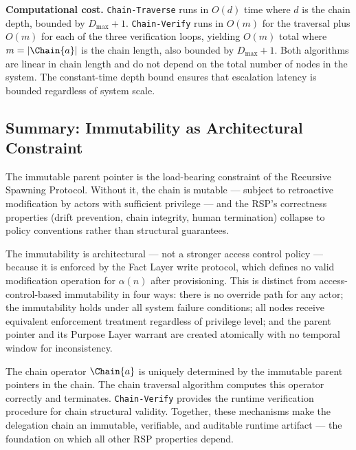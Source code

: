 \medskip
\noindent\textbf{Computational cost.} \texttt{Chain-Traverse} runs in $O(d)$ time where $d$ is the chain depth, bounded by $D_{\max} + 1$. \texttt{Chain-Verify} runs in $O(m)$ for the traversal plus $O(m)$ for each of the three verification loops, yielding $O(m)$ total where $m = |\Chain{a}|$ is the chain length, also bounded by $D_{\max} + 1$. Both algorithms are linear in chain length and do not depend on the total number of nodes in the system. The constant-time depth bound ensures that escalation latency is bounded regardless of system scale.

\subsection{Summary: Immutability as Architectural Constraint}
\label{sec:immutability-summary}

The immutable parent pointer is the load-bearing constraint of the Recursive Spawning Protocol. Without it, the chain is mutable — subject to retroactive modification by actors with sufficient privilege — and the RSP's correctness properties (drift prevention, chain integrity, human termination) collapse to policy conventions rather than structural guarantees.

The immutability is architectural — not a stronger access control policy — because it is enforced by the Fact Layer write protocol, which defines no valid modification operation for $\alpha(n)$ after provisioning. This is distinct from access-control-based immutability in four ways: there is no override path for any actor; the immutability holds under all system failure conditions; all nodes receive equivalent enforcement treatment regardless of privilege level; and the parent pointer and its Purpose Layer warrant are created atomically with no temporal window for inconsistency.

The chain operator $\Chain{a}$ is uniquely determined by the immutable parent pointers in the chain. The chain traversal algorithm computes this operator correctly and terminates. \texttt{Chain-Verify} provides the runtime verification procedure for chain structural validity. Together, these mechanisms make the delegation chain an immutable, verifiable, and auditable runtime artifact — the foundation on which all other RSP properties depend.
